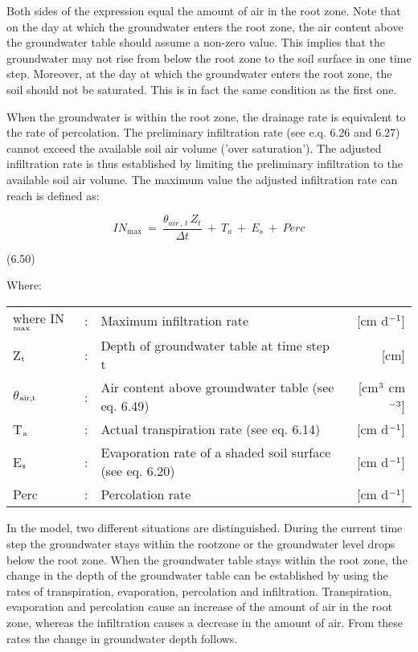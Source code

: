 Both sides of the expression equal the amount of air in the root zone. Note that on the
day at which the groundwater enters the root zone, the air content above the groundwater
table should assume a non-zero value. This implies that the groundwater may not rise
from below the root zone to the soil surface in one time step. Moreover, at the day at
which the groundwater enters the root zone, the soil should not be saturated. This is in
fact the same condition as the first one. 



When the groundwater is within the root zone, the drainage rate is equivalent to the rate
of percolation. The preliminary infiltration rate (see e.q. 6.26 and 6.27) cannot exceed
the available soil air volume ('over saturation'). The adjusted infiltration rate is thus
established by limiting the preliminary infiltration to the available soil air volume. The
maximum value the adjusted infiltration rate can reach is defined as:

\begin{equation}
IN _{\max } ~=~{\frac{\theta _{air\, ,\, t} \, Z _{t} }{\Delta t}} ~+~ T _{a} ~+~ E _{s} ~+~ Perc
\end{equation}

 
\strut\hfill (6.50)

Where:\\
\begin{tabularx}{\textwidth}{llXr}



where IN$_{{\rm max}}$ &:& Maximum infiltration rate  & [cm d$^{{\rm -1}}$]\\
Z$_{{\rm t}}$ &:& Depth of groundwater table at time step t  & [cm]\\
$\theta$$_{{\rm air,t}}$ &:& Air content above groundwater table (see eq. 6.49)  & [cm$^{{\rm 3}}$ cm$^{{\rm -3}}$]\\
T$_{{\rm a}}$ &:& Actual transpiration rate (see eq. 6.14)  & [cm d$^{{\rm -1}}$]\\
E$_{{\rm s}}$ &:& Evaporation rate of a shaded soil surface (see eq. 6.20)  & [cm d$^{{\rm -1}}$]\\
Perc &:& Percolation rate  & [cm d$^{{\rm -1}}$]
\end{tabularx}



 In the model, two different situations are distinguished. During the current time step the
ground\-water stays within the rootzone or the groundwater level drops below the root
zone. When the groundwater table stays within the root zone, the change in the depth of
the groundwater table can be established by using the rates of transpiration, evaporation,
percolation and infiltration. Transpiration, evaporation and percolation cause an increase
of the amount of air in the root zone, whereas the infiltration causes a decrease in the
amount of air. From these rates the change in groundwater depth follows. 

